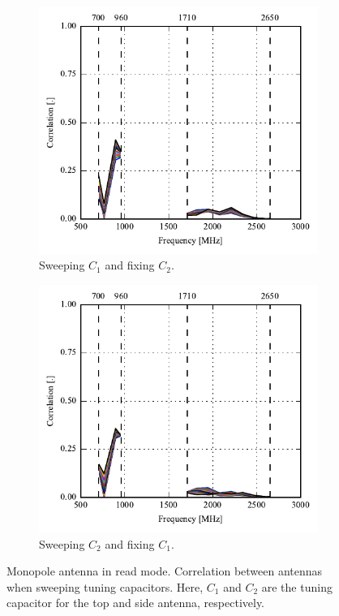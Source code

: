 \begin{figure}[htbp]
    \centering
    \begin{subfigure}{0.49\linewidth}
        \includegraphics{img/tech_sol/monopole/read_mode/s11_corr}
        \caption{Sweeping $C_1$ and fixing $C_2$.}
    \end{subfigure}
    \hfill
    \begin{subfigure}{0.49\linewidth}
        \includegraphics{img/tech_sol/monopole/read_mode/s22_corr}
        \caption{Sweeping $C_2$ and fixing $C_1$.}
    \end{subfigure}
    \caption{Monopole antenna in read mode. Correlation between antennas when sweeping tuning capacitors. Here, $C_1$ and $C_2$ are the tuning capacitor for the top and side antenna, respectively.}
    \label{fig:corr_sols_read}
\end{figure}

